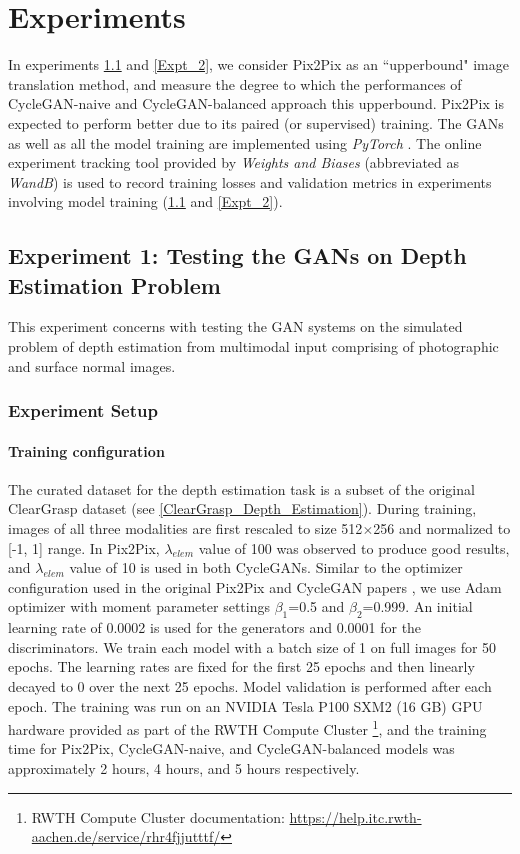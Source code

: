 \chapter{Experiments}
\label{Experiments}
In experiments \ref{Expt_1} and \ref{Expt_2}, we consider Pix2Pix as an ``upperbound" image translation method, and measure the degree to which the performances of CycleGAN-naive and CycleGAN-balanced approach this upperbound. Pix2Pix is expected to perform better due to its paired (or supervised) training. The GANs as well as all the model training are implemented using \textit{PyTorch} \cite{NEURIPS2019_9015}. The online experiment tracking tool provided by \textit{Weights and Biases} (abbreviated as \textit{WandB}) is used to record training losses and validation metrics in experiments involving model training (\ref{Expt_1} and \ref{Expt_2}).



\section{Experiment 1: Testing the GANs on Depth Estimation Problem}
\label{Expt_1}

This experiment concerns with testing the GAN systems on the simulated problem of depth estimation from multimodal input comprising of photographic and surface normal images.


\subsection{Experiment Setup}

\subsubsection{Training configuration}
The curated dataset for the depth estimation task is a subset of the original ClearGrasp dataset (see \ref{ClearGrasp_Depth_Estimation}). During training, images of all three modalities are first rescaled to size 512$\times$256 and normalized to [-1, 1] range.  In Pix2Pix, $\lambda_{elem}$ value of 100 was observed to produce good results, and $\lambda_{elem}$ value of 10 is used in both CycleGANs. Similar to the optimizer configuration used in the original Pix2Pix and CycleGAN papers \cite{isola2017image, zhu2017unpaired}, we use Adam optimizer with moment parameter settings $\beta_1$=0.5 and $\beta_2$=0.999. An initial learning rate of 0.0002 is used for the generators and 0.0001 for the discriminators. We train each model with a batch size of 1 on full images for 50 epochs. The learning rates are fixed for the first 25 epochs and then linearly decayed to 0 over the next 25 epochs. Model validation is performed after each epoch. The training was run on an NVIDIA Tesla P100 SXM2 (16 GB) GPU hardware provided as part of the RWTH Compute Cluster \footnote{RWTH Compute Cluster documentation: \url{https://help.itc.rwth-aachen.de/service/rhr4fjjutttf/}}, and the training time for Pix2Pix, CycleGAN-naive, and CycleGAN-balanced models was approximately 2 hours, 4 hours, and 5 hours respectively.

